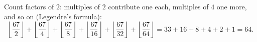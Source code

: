 Count factors of $2$: multiples of $2$ contribute one each, multiples of $4$ one more, and so on (Legendre's formula):
\[\left\lfloor\dfrac{67}2\right\rfloor+\left\lfloor\dfrac{67}4\right\rfloor+\left\lfloor\dfrac{67}8\right\rfloor+\left\lfloor\dfrac{67}{16}\right\rfloor+\left\lfloor\dfrac{67}{32}\right\rfloor+\left\lfloor\dfrac{67}{64}\right\rfloor=33+16+8+4+2+1=\boxed{64}.\]
